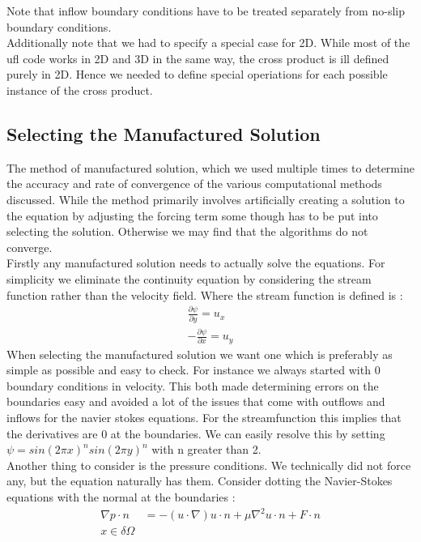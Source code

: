 \documentclass[11pt,twoside,a4paper]{article}
\begin{document}
Note that inflow boundary conditions have to be treated separately from no-slip boundary conditions.\\
Additionally note that we had to specify a special case for 2D. While most of the ufl code works in 2D and 3D in the same way, the cross product is ill defined purely in 2D. Hence we needed to define special operiations for each possible instance of the cross product.\\

\subsection{Selecting the Manufactured Solution}
The method of manufactured solution, which we used multiple times to determine the accuracy and rate of convergence of the various computational methods discussed. While the method primarily involves artificially creating a solution to the equation by adjusting the forcing term some though has to be put into selecting the solution. Otherwise we may find that the algorithms do not converge.\\
Firstly any manufactured solution needs to actually solve the equations. For simplicity we eliminate the continuity equation by considering the stream function rather than the velocity field. Where the stream function is defined is :
\begin{align*}
\frac{ \partial \psi}{\partial y} = u_x \\
-\frac{\partial \psi}{\partial x} = u_y
\end{align*}
When selecting the manufactured solution we want one which is preferably as simple as possible and easy to check. For instance we always started with $0$ boundary conditions in velocity. This both made determining errors on the boundaries easy and avoided a lot of the issues that come with outflows and inflows for the navier stokes equations. For the streamfunction this implies that the derivatives are 0 at the boundaries. We can easily resolve this by setting $\psi = sin(2 \pi x)^n sin(2 \pi y)^n$ with n greater than 2.\\
Another thing to consider is the pressure conditions. We technically did not force any, but the equation naturally has them. Consider dotting the Navier-Stokes equations with the normal at the boundaries :
\begin{align*}
\nabla p \cdot n &= -(u \cdot \nabla) u \cdot n  + \mu \nabla^2 u \cdot n + F \cdot n \\
x \in \delta \Omega
\end{align*}
\end{document}
